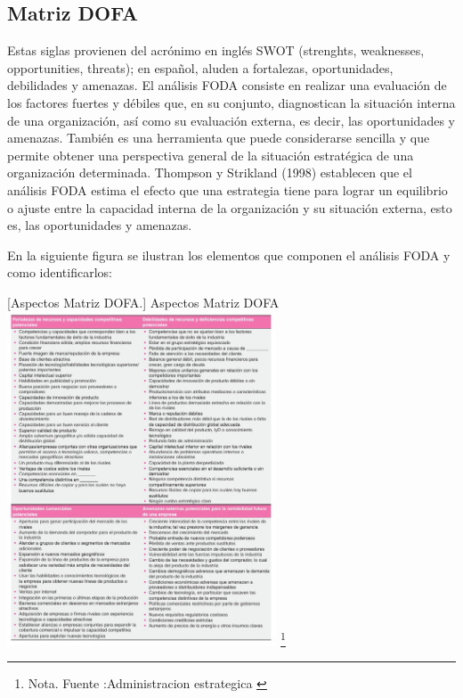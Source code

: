 \color{black}
\subsection{Matriz DOFA}
Estas siglas provienen del acrónimo en inglés SWOT (strenghts, weaknesses, opportunities, threats); en español, aluden a fortalezas, oportunidades, debilidades y amenazas. El análisis FODA consiste en realizar una evaluación de los factores fuertes y débiles que, en su conjunto, diagnostican la situación interna de una organización, así como su evaluación externa, es decir, las oportunidades y amenazas. También es una herramienta que puede considerarse sencilla y que permite obtener una perspectiva general de la situación estratégica de una organización determinada. Thompson y Strikland (1998) establecen que el análisis FODA estima el efecto que una estrategia tiene para lograr un equilibrio o ajuste entre la capacidad interna de la organización y su situación externa, esto es, las oportunidades y amenazas. \cite{Dofa}

En la siguiente figura se ilustran los elementos que componen el análisis FODA y como identificarlos:

\vspace{2mm}
\begin{minipage}{0.9\textwidth}
\centering
{}[{Aspectos Matriz DOFA.}]{ Aspectos Matriz DOFA }
\label{dofa}
\includegraphics[width=0.6\textwidth]{Content/Images/dofa-ejemplo.jpeg}
\footnote{Nota. \textup{Fuente :Administracion estrategica
\cite{administracion-estrategica}}}
\end{minipage}

